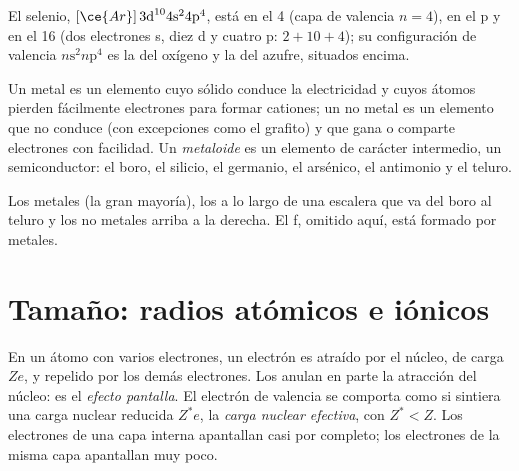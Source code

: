 \begin{example}\label{ex:b1:periodicity:position}
El selenio, $[\ce{Ar}]\,3\text{d}^{10} 4\text{s}^2 4\text{p}^4$, está en
el  4 (capa de valencia $n = 4$), en el  p y en el  16
(dos electrones s, diez d y cuatro p: $2 + 10 + 4$); su configuración de
valencia $n\text{s}^2 n\text{p}^4$ es la del oxígeno y la del azufre,
situados encima.
\end{example}

\begin{definition}\label{def:b1:periodicity:metalloid}
Un metal es un elemento cuyo sólido conduce la electricidad y cuyos
átomos pierden fácilmente electrones para formar cationes; un no metal es
un elemento que no conduce (con excepciones como el grafito) y que gana
o comparte electrones con facilidad. Un \emph{metaloide}
es un elemento de carácter intermedio, un semiconductor: el boro, el
silicio, el germanio, el arsénico, el antimonio y el teluro.
\end{definition}

\begin{omfigure}
\omperiodictable[colour=metals, legend, f block=false]

{\small Los metales (la gran mayoría), los  a lo largo de una
escalera que va del boro al teluro y los no metales arriba a la derecha.
El  f, omitido aquí, está formado por metales.}
\end{omfigure}

\section{Tamaño: radios atómicos e iónicos}

\begin{definition}\label{def:b1:periodicity:screening}
En un átomo con varios electrones, un electrón es atraído por el núcleo,
de carga $Ze$, y repelido por los demás electrones. Los  anulan en parte la atracción del núcleo: es el
\emph{efecto pantalla}. El electrón de valencia se
comporta como si sintiera una carga nuclear reducida $Z^{*}e$, la
\emph{carga nuclear efectiva}, con
$Z^{*} < Z$. Los electrones de una capa interna apantallan casi por
completo; los electrones de la misma capa apantallan muy poco.
\end{definition}

